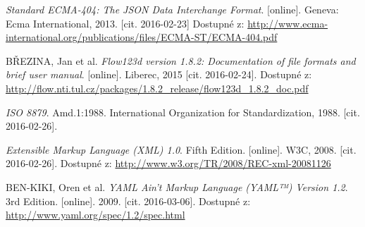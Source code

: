 \documentclass[FM,bw,DP]{tulthesis}
\begin{document}
\begin{thebibliography}{9}


\textit{Standard ECMA-404: The JSON Data Interchange Format}. [online]. Geneva: Ecma International, 2013. [cit. 2016-02-23] Dostupné z: \url{http://www.ecma-international.org/publications/files/ECMA-ST/ECMA-404.pdf}

BŘEZINA, Jan et al. \textit{Flow123d version 1.8.2: Documentation of file formats and brief user manual}. [online]. Liberec, 2015 [cit. 2016-02-24]. Dostupné z: \url{http://flow.nti.tul.cz/packages/1.8.2_release/flow123d_1.8.2_doc.pdf}

\textit{ISO 8879}. Amd.1:1988. International Organization for Standardization, 1988. [cit. 2016-02-26]. 

\textit{Extensible Markup Language (XML) 1.0}. Fifth Edition. [online]. W3C, 2008. [cit. 2016-02-26]. Dostupné z: \url{http://www.w3.org/TR/2008/REC-xml-20081126}

BEN-KIKI, Oren et al. \textit{YAML Ain’t Markup Language (YAML™) Version 1.2}. 3rd Edition. [online]. 2009. [cit. 2016-03-06]. Dostupné z: \url{http://www.yaml.org/spec/1.2/spec.html}


\end{thebibliography}
\end{document}
